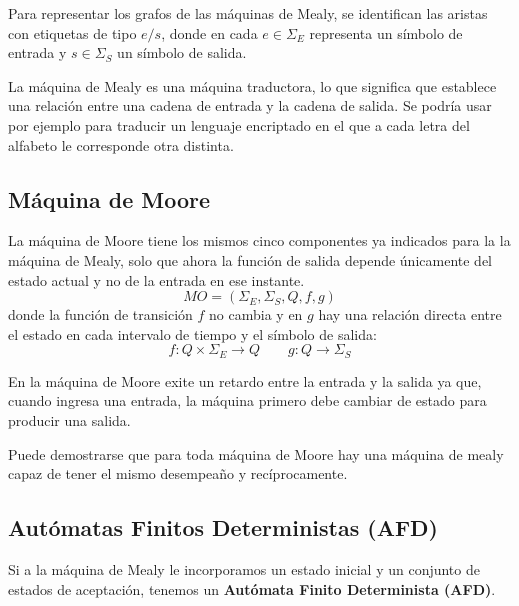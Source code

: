 \documentclass[12pt]{article}
\begin{document}
Para representar los grafos de las máquinas de Mealy, se identifican las aristas con etiquetas de tipo $ e/s $, donde en cada $ e \in \Sigma_{E} $ representa un símbolo de entrada y $ s \in \Sigma_{S} $ un símbolo de salida.
\begin{center}
\end{center}

La máquina de Mealy es una máquina traductora, lo que significa que establece una relación entre una cadena de entrada y la cadena de salida. Se podría usar por ejemplo para traducir un lenguaje encriptado en el que a cada letra del alfabeto le corresponde otra distinta. 

\subsection{Máquina de Moore}
La máquina de Moore tiene los mismos cinco componentes ya indicados para la la máquina de Mealy, solo que ahora la función de salida depende únicamente del estado actual y no de la entrada en ese instante.
\[
MO = \left(\Sigma_{E}, \Sigma_{S}, Q, f, g\right)
\]
donde la función de transición $ f $ no cambia y en $ g $ hay una relación directa entre el estado en cada intervalo de tiempo y el símbolo de salida:
\[
f:Q\times \Sigma_{E} \to Q \qquad g:Q \to \Sigma_{S}
\]

En la máquina de Moore exite un retardo entre la entrada y la salida ya que, cuando ingresa una entrada, la máquina primero debe cambiar de estado para producir una salida.

Puede demostrarse que para toda máquina de Moore hay una máquina de mealy capaz de tener el mismo desempeaño y recíprocamente.

\subsection{Autómatas Finitos Deterministas (AFD)}
Si a la máquina de Mealy le incorporamos un estado inicial y un conjunto de estados de aceptación, tenemos un \textbf{Autómata Finito Determinista (AFD)}. 
\end{document}
